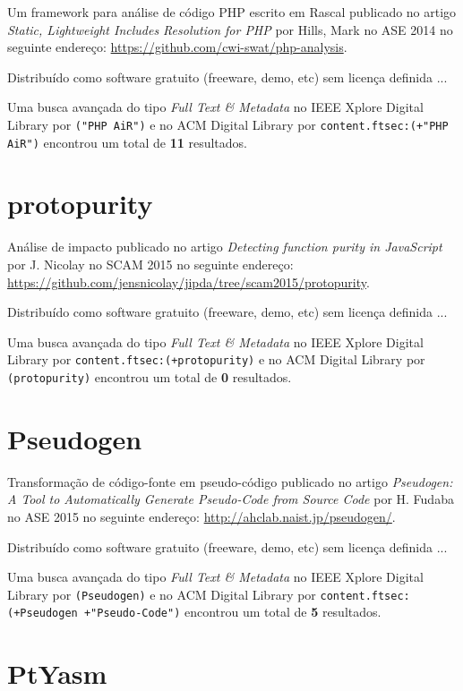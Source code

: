 Um framework para análise de código PHP escrito em Rascal
publicado no artigo
{\it Static, Lightweight Includes Resolution for PHP}
por
Hills, Mark
no
ASE
2014
no seguinte endereço:
\url{https://github.com/cwi-swat/php-analysis}.

Distribuído como software gratuito (freeware, demo, etc)
sem licença definida ...


Uma busca avançada do tipo {\it Full Text \& Metadata} no IEEE Xplore Digital Library por
\texttt{("PHP AiR")}
e no ACM Digital Library por
\texttt{content.ftsec:(+"PHP AiR")}
encontrou um total de
{\bf 11}
resultados.

\section{protopurity}

Análise de impacto
publicado no artigo
{\it Detecting function purity in JavaScript}
por
J. Nicolay
no
SCAM
2015
no seguinte endereço:
\url{https://github.com/jensnicolay/jipda/tree/scam2015/protopurity}.

Distribuído como software gratuito (freeware, demo, etc)
sem licença definida ...


Uma busca avançada do tipo {\it Full Text \& Metadata} no IEEE Xplore Digital Library por
\texttt{content.ftsec:(+protopurity)}
e no ACM Digital Library por
\texttt{(protopurity)}
encontrou um total de
{\bf 0}
resultados.

\section{Pseudogen}

Transformação de código-fonte em pseudo-código
publicado no artigo
{\it Pseudogen: A Tool to Automatically Generate Pseudo-Code from Source Code}
por
H. Fudaba
no
ASE
2015
no seguinte endereço:
\url{http://ahclab.naist.jp/pseudogen/}.

Distribuído como software gratuito (freeware, demo, etc)
sem licença definida ...


Uma busca avançada do tipo {\it Full Text \& Metadata} no IEEE Xplore Digital Library por
\texttt{(Pseudogen)}
e no ACM Digital Library por
\texttt{content.ftsec:(+Pseudogen +"Pseudo-Code")}
encontrou um total de
{\bf 5}
resultados.

\section{PtYasm}

